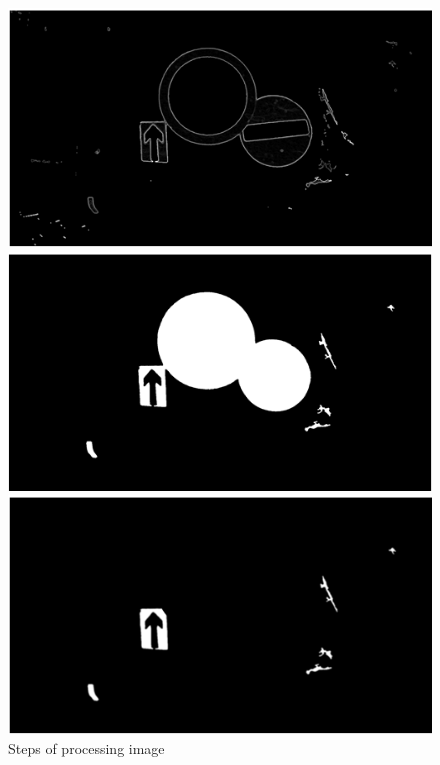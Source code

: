 \begin{figure}[H]
	\newline
	\includegraphics[width=\linewidth]{images/zynq3.png}
	\caption{}\label{fig:zynq3}
	\endminipage\hfill
	\includegraphics[width=\linewidth]{images/zynq4.png}
	\caption{}\label{fig:zynq4}
	\endminipage\hfill
	\includegraphics[width=\linewidth]{images/zynq5.png}
	\caption{}\label{fig:zynq5}
	\endminipage
	\newline
	\caption{Steps of processing image}
\end{figure}

